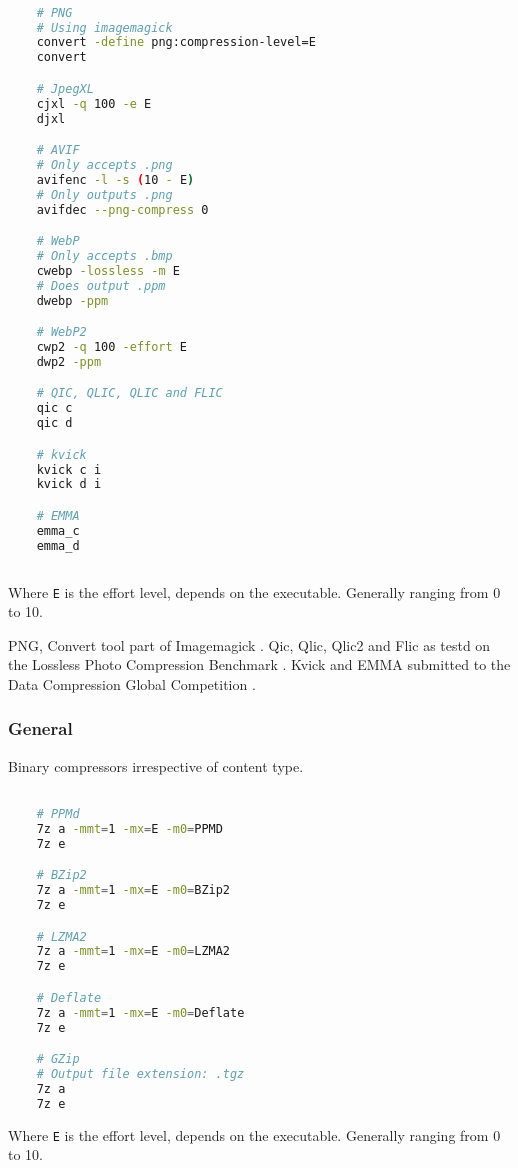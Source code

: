 \documentclass[11pt,a4paper]{report}
\begin{document}
\begin{lstlisting}[language = bash]

    # PNG
    # Using imagemagick
    convert -define png:compression-level=E
    convert

    # JpegXL
    cjxl -q 100 -e E
    djxl

    # AVIF
    # Only accepts .png
    avifenc -l -s (10 - E)
    # Only outputs .png
    avifdec --png-compress 0

    # WebP
    # Only accepts .bmp
    cwebp -lossless -m E
    # Does output .ppm
    dwebp -ppm

    # WebP2
    cwp2 -q 100 -effort E
    dwp2 -ppm

    # QIC, QLIC, QLIC and FLIC
    qic c
    qic d

    # kvick
    kvick c i
    kvick d i

    # EMMA
    emma_c
    emma_d
    
\end{lstlisting}

Where \verb|E| is the effort level, depends on the executable. Generally ranging from 0 to 10.

PNG, Convert tool part of Imagemagick \cite{imagemagick}. Qic, Qlic, Qlic2 and Flic as testd on the Lossless Photo Compression Benchmark \cite{lpcb}. Kvick and EMMA submitted to the Data Compression Global Competition \cite{dcgc}.

\subsubsection{General}

Binary compressors irrespective of content type.

\begin{lstlisting}[language = bash]

    # PPMd
    7z a -mmt=1 -mx=E -m0=PPMD
    7z e

    # BZip2
    7z a -mmt=1 -mx=E -m0=BZip2
    7z e

    # LZMA2
    7z a -mmt=1 -mx=E -m0=LZMA2
    7z e

    # Deflate
    7z a -mmt=1 -mx=E -m0=Deflate
    7z e

    # GZip
    # Output file extension: .tgz
    7z a
    7z e

\end{lstlisting}

Where \verb|E| is the effort level, depends on the executable. Generally ranging from 0 to 10.
\end{document}
